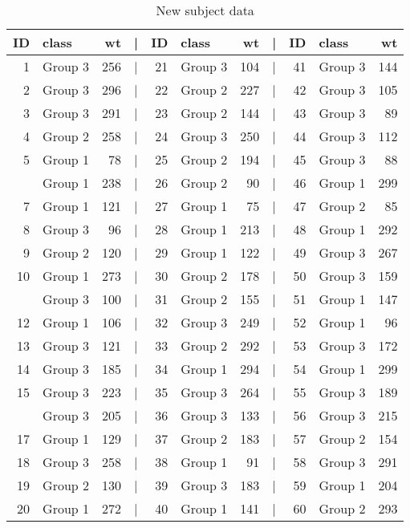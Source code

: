 \documentclass[smallextended]{svjour3}       %
\begin{document}
\begin{table}

\caption{\label{tab:new-data}New subject data}
\centering
\begin{tabular}[t]{rlrlrlrlrlr}
\toprule
ID & class & wt & | & ID & class & wt & | & ID & class & wt\\
\midrule
1 & Group 3 & 256 & | & 21 & Group 3 & 104 & | & 41 & Group 3 & 144\\
2 & Group 3 & 296 & | & 22 & Group 2 & 227 & | & 42 & Group 3 & 105\\
3 & Group 3 & 291 & | & 23 & Group 2 & 144 & | & 43 & Group 3 & 89\\
4 & Group 2 & 258 & | & 24 & Group 3 & 250 & | & 44 & Group 3 & 112\\
5 & Group 1 & 78 & | & 25 & Group 2 & 194 & | & 45 & Group 3 & 88\\
\addlinespace
6 & Group 1 & 238 & | & 26 & Group 2 & 90 & | & 46 & Group 1 & 299\\
7 & Group 1 & 121 & | & 27 & Group 1 & 75 & | & 47 & Group 2 & 85\\
8 & Group 3 & 96 & | & 28 & Group 1 & 213 & | & 48 & Group 1 & 292\\
9 & Group 2 & 120 & | & 29 & Group 1 & 122 & | & 49 & Group 3 & 267\\
10 & Group 1 & 273 & | & 30 & Group 2 & 178 & | & 50 & Group 3 & 159\\
\addlinespace
11 & Group 3 & 100 & | & 31 & Group 2 & 155 & | & 51 & Group 1 & 147\\
12 & Group 1 & 106 & | & 32 & Group 3 & 249 & | & 52 & Group 1 & 96\\
13 & Group 3 & 121 & | & 33 & Group 2 & 292 & | & 53 & Group 3 & 172\\
14 & Group 3 & 185 & | & 34 & Group 1 & 294 & | & 54 & Group 1 & 299\\
15 & Group 3 & 223 & | & 35 & Group 3 & 264 & | & 55 & Group 3 & 189\\
\addlinespace
16 & Group 3 & 205 & | & 36 & Group 3 & 133 & | & 56 & Group 3 & 215\\
17 & Group 1 & 129 & | & 37 & Group 2 & 183 & | & 57 & Group 2 & 154\\
18 & Group 3 & 258 & | & 38 & Group 1 & 91 & | & 58 & Group 3 & 291\\
19 & Group 2 & 130 & | & 39 & Group 3 & 183 & | & 59 & Group 1 & 204\\
20 & Group 1 & 272 & | & 40 & Group 1 & 141 & | & 60 & Group 2 & 293\\
\bottomrule
\end{tabular}
\end{table}
\end{document}
